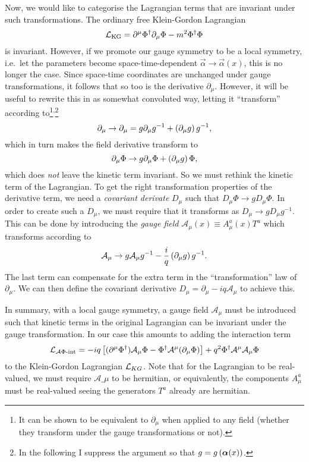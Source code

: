 \documentclass[../main.tex]{subfiles}
\begin{document}
Now, we would like to categorise the Lagrangian terms that are invariant under
such transformations.
The ordinary free Klein-Gordon Lagrangian
\begin{equation}
  \mathcal{L}_\text{KG} = \partial^\mu \Phi^\dagger \partial_\mu \Phi - m^2 \Phi^\dagger \Phi
\end{equation}
is invariant.
However, if we promote our gauge symmetry to be a local symmetry, i.e.\ let the
parameters become space-time-dependent \(\vec{\alpha} \to \vec{\alpha}(x)\),
this is no longer the case.
Since space-time coordinates are unchanged under gauge transformations, it
follows that so too is the derivative \(\partial_\mu\).
However, it will be useful to rewrite this in as somewhat convoluted way,
letting it ``transform'' according to\footnote{It can be shown to be equivalent
  to \(\partial_\mu\) when applied to any field (whether they transform under
  the
  gauge transformations or not).}\textsuperscript{,}\footnote{In the following I suppress the
  argument so that \(g = g\left(\boldsymbol{\alpha}(x)\right)\).}
\begin{equation}
  \partial_\mu \to \partial_\mu = g \partial_\mu g^{-1} +
  \left(\partial_\mu g\right) g^{-1},
\end{equation}
which in turn makes the field derivative transform to
\begin{equation}
  \partial_\mu \Phi \to g \partial_\mu \Phi + \left(\partial_\mu g\right) \Phi,
\end{equation}
which does \emph{not} leave the kinetic term invariant.
So we must rethink the kinetic term of the Lagrangian.
To get the right transformation properties of the derivative term, we need a
\emph{covariant derivate } \(D_\mu\) such that \(D_\mu \Phi \to g D_\mu
\Phi\).
In order to create such a \(D_\mu\), we must require that it transforms as
\(D_\mu \to g D_\mu g^{-1}\).
This can be done by introducing the \emph{gauge field} \(\mathcal{A}_\mu(x)
\equiv A_\mu^a(x) T^a\) which transforms according to
\begin{equation}
  \mathcal{A}_\mu \to g \mathcal{A}_\mu g^{-1} - \frac{i}{q}
  \left(\partial_\mu g\right) g^{-1}.
\end{equation}
The last term can compensate for the extra term in the ``transformation'' law
of \(\partial_\mu\).
We can then define the covariant derivative \(D_\mu = \partial_\mu - iq
\mathcal{A}_\mu\) to achieve this.
\medskip

In summary, with a local gauge symmetry, a gauge field \(\mathcal{A}_\mu\) must
be introduced such that kinetic terms in the original Lagrangian can be
invariant under the gauge transformation. In our case this amounts to adding
the interaction term
\begin{equation}
  \mathcal{L}_{\mathcal{A}\Phi\text{-int}} = -iq\left[(\partial^\mu \Phi^\dagger)
    \mathcal{A}_\mu \Phi - \Phi^\dagger \mathcal{A}^\mu (\partial_\mu
    \Phi)\right] + q^2
  \Phi^\dagger \mathcal{A}^\mu \mathcal{A}_\mu \Phi
\end{equation}
to the Klein-Gordon Lagrangian \(\mathcal{L}_{KG}\).
Note that for the Lagrangian to be real-valued, we must require \(\mathcal{A}\_\mu\) to be hermitian, or equivalently, the components \(A_\mu^a\) must be real-valued seeing the generators \(T^a\) already are hermitian.
\end{document}
